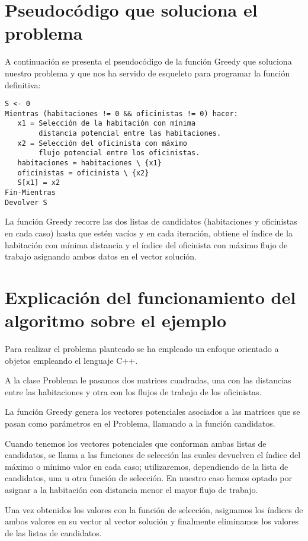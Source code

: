 \documentclass[11pt, a4paper]{article}
\theoremstyle{theorem-style}
\theoremstyle{definition-style}
\theoremstyle{remark-style}
\theoremstyle{example-style}
\begin{document}
\section{Pseudocódigo que soluciona el problema}
A continuación se presenta el pseudocódigo de la función Greedy que soluciona nuestro problema y que nos ha servido de esqueleto para programar la función definitiva:
\begin{verbatim}
S <- 0
Mientras (habitaciones != 0 && oficinistas != 0) hacer:
   x1 = Selección de la habitación con mínima 
        distancia potencial entre las habitaciones.
   x2 = Selección del oficinista con máximo 
        flujo potencial entre los oficinistas.
   habitaciones = habitaciones \ {x1}
   oficinistas = oficinista \ {x2}
   S[x1] = x2
Fin-Mientras
Devolver S
\end{verbatim}

La función Greedy recorre las dos listas de candidatos (habitaciones y oficinistas en cada caso) hasta que estén vacíos y en cada iteración, obtiene el índice de la habitación con mínima distancia y el índice del oficinista con máximo flujo de trabajo asignando ambos datos en el vector solución.


\section{Explicación del funcionamiento del algoritmo sobre el ejemplo}
Para realizar el problema planteado se ha empleado un enfoque orientado a objetos empleando el lenguaje C++. 

A la clase Problema le pasamos dos matrices cuadradas, una con las distancias entre las habitaciones y otra con los flujos de trabajo de los oficinistas.

La función Greedy genera los vectores potenciales asociados a las matrices que se pasan como parámetros en el Problema, llamando a la función candidatos. 

Cuando tenemos los vectores potenciales que conforman ambas listas de candidatos, se llama a las funciones de selección las cuales devuelven el índice del máximo o mínimo valor en cada caso; utilizaremos, dependiendo de la lista de candidatos, una u otra función de selección. En nuestro caso hemos optado por asignar a la habitación con distancia menor el mayor flujo de trabajo.

Una vez obtenidos los valores con la función de selección, asignamos los índices de ambos valores en su vector al vector solución y finalmente eliminamos los valores de las listas de candidatos.
\end{document}
